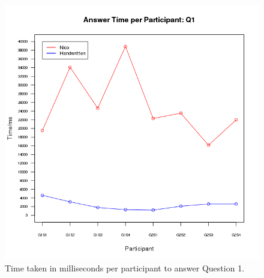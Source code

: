 \documentclass[12pt,twoside,notitlepage,xetex]{report}
\begin{document}
\begin{center}
\begin{figure}[H]
\begin{center}
\includegraphics[height=\textheight/2-2cm]{figs/graphs/q1.png}
\end{center}
\caption{Time taken in milliseconds per participant to answer Question 1.}
\end{figure}
\end{center}
\end{document}
